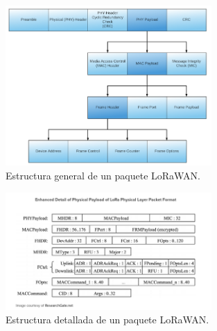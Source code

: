 \documentclass[12pt]{article}
\begin{document}
	\begin{figure}[h]
	\begin{center}
			\includegraphics[width=0.7\textwidth]{img/lora_phyLayer_packetFormat.png}
			\caption{Estructura general de un paquete LoRaWAN.}
	\end{center}
	\end{figure}
	

	
	\begin{figure}[h]
	\begin{center}
			\includegraphics[width=0.7\textwidth]{img/lora_phyLayer_packetFormat_enh.png}
			\caption{Estructura detallada de un paquete LoRaWAN.}
	\end{center}
	\end{figure}

	\pagebreak

	
	
\end{document}
